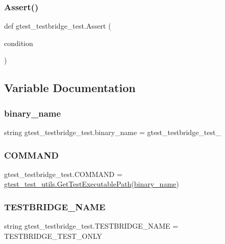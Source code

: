\subsubsection{\texorpdfstring{Assert()}{Assert()}}
{\footnotesize\ttfamily def gtest\+\_\+testbridge\+\_\+test.\+Assert (\begin{DoxyParamCaption}\item[{}]{condition }\end{DoxyParamCaption})}



\subsection{Variable Documentation}
\mbox{\label{namespacegtest__testbridge__test_a977d1efd7bcefffc40c3180756a22b54}} 
\subsubsection{\texorpdfstring{binary\_name}{binary\_name}}
{\footnotesize\ttfamily string gtest\+\_\+testbridge\+\_\+test.\+binary\+\_\+name = \textquotesingle{}gtest\+\_\+testbridge\+\_\+test\+\_\+\textquotesingle{}}

\mbox{\label{namespacegtest__testbridge__test_a877e21091a8b1b2c70f8741279592c4a}} 
\subsubsection{\texorpdfstring{COMMAND}{COMMAND}}
{\footnotesize\ttfamily gtest\+\_\+testbridge\+\_\+test.\+C\+O\+M\+M\+A\+ND = \mbox{\hyperlink{namespacegtest__test__utils_a89ed3717984a80ffbb7a9c92f71b86a2}{gtest\+\_\+test\+\_\+utils.\+Get\+Test\+Executable\+Path}}(\mbox{\hyperlink{namespacegtest__testbridge__test_a977d1efd7bcefffc40c3180756a22b54}{binary\+\_\+name}})}

\mbox{\label{namespacegtest__testbridge__test_a33605c2f318125cd970d016043c05d8f}} 
\subsubsection{\texorpdfstring{TESTBRIDGE\_NAME}{TESTBRIDGE\_NAME}}
{\footnotesize\ttfamily string gtest\+\_\+testbridge\+\_\+test.\+T\+E\+S\+T\+B\+R\+I\+D\+G\+E\+\_\+\+N\+A\+ME = \textquotesingle{}T\+E\+S\+T\+B\+R\+I\+D\+G\+E\+\_\+\+T\+E\+S\+T\+\_\+\+O\+N\+LY\textquotesingle{}}

